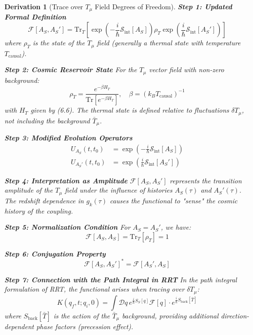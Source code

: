\documentclass[10pt, a4paper]{article}
\newcommand{\Tr}{\text{Tr}}
\newtheorem{derivation}{Derivation}
\begin{document}
\begin{derivation}[Trace over $T_\mu$ Field Degrees of Freedom]
\textbf{Step 1: Updated Formal Definition}
\begin{equation}
\mathcal{F}[A_S, A_S'] = \Tr_{T} \left[ \exp\left( -\frac{i}{\hbar} \mathcal{S}_{\text{int}}[A_S] \right) \rho_T \exp\left( \frac{i}{\hbar} \mathcal{S}_{\text{int}}[A_S'] \right) \right]
\tag{11.1}
\end{equation}
where $\rho_T$ is the state of the $T_\mu$ field (generally a thermal state with temperature $T_{\text{causal}}$).

\textbf{Step 2: Cosmic Reservoir State}
For the $T_\mu$ vector field with non-zero background:
\begin{equation}
\rho_T = \frac{e^{-\beta H_T}}{\Tr[e^{-\beta H_T}]}, \quad \beta = (k_B T_{\text{causal}})^{-1}
\tag{11.2}
\end{equation}
with $H_T$ given by (6.6). The thermal state is defined relative to fluctuations $\delta T_\mu$, not including the background $\bar{T}_\mu$.

\textbf{Step 3: Modified Evolution Operators}
\begin{align}
U_{A_S}(t,t_0) &= \exp\left( -\frac{i}{\hbar} \mathcal{S}_{\text{int}}[A_S] \right)
\tag{11.3} \\
U_{A_S'}(t,t_0) &= \exp\left( \frac{i}{\hbar} \mathcal{S}_{\text{int}}[A_S'] \right)
\tag{11.4}
\end{align}

\textbf{Step 4: Interpretation as Amplitude}
$\mathcal{F}[A_S, A_S']$ represents the transition amplitude of the $T_\mu$ field under the influence of histories $A_S(\tau)$ and $A_S'(\tau)$. The redshift dependence in $g_k(\tau)$ causes the functional to "sense" the cosmic history of the coupling.

\textbf{Step 5: Normalization Condition}
For $A_S = A_S'$, we have:
\begin{equation}
\mathcal{F}[A_S, A_S] = \Tr_T[\rho_T] = 1
\tag{11.5}
\end{equation}

\textbf{Step 6: Conjugation Property}
\begin{equation}
\mathcal{F}[A_S, A_S']^* = \mathcal{F}[A_S', A_S]
\tag{11.6}
\end{equation}

\textbf{Step 7: Connection with the Path Integral in RRT}
In the path integral formulation of RRT, the functional arises when tracing over $\delta T_\mu$:
\begin{equation}
K(q_f, t; q_i, 0) = \int \mathscr{D}q \, e^{\frac{i}{\hbar} S_S[q]} \mathcal{F}[q] \cdot e^{\frac{i}{\hbar} S_{\text{back}}[\bar{T}]}
\tag{11.7}
\end{equation}
where $S_{\text{back}}[\bar{T}]$ is the action of the $\bar{T}_\mu$ background, providing additional direction-dependent phase factors (precession effect).
\end{derivation}
\end{document}

